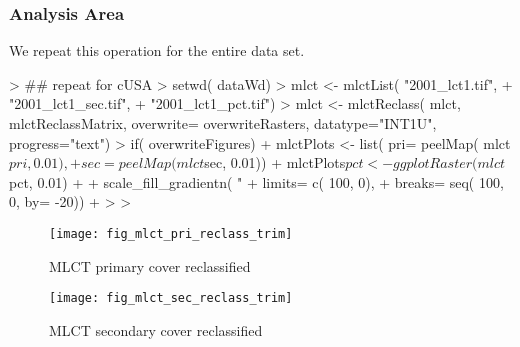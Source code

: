 \subsubsection{Analysis Area}
\label{sec:reclass-analysis-area}

We repeat this operation for the entire data set.


\begin{Schunk}
\begin{Sinput}
> ## repeat for cUSA
> setwd( dataWd)
> mlct <- mlctList( "2001_lct1.tif", 
+                   "2001_lct1_sec.tif", 
+                   "2001_lct1_pct.tif")
> mlct  <- mlctReclass( mlct, mlctReclassMatrix, overwrite= overwriteRasters, datatype="INT1U", progress="text")
> if( overwriteFigures) {
+   mlctPlots <- list( pri= peelMap( mlct$pri, 0.01),
+                     sec= peelMap( mlct$sec, 0.01))
+   mlctPlots$pct <- ggplotRaster( mlct$pct, 0.01) + 
+     scale_fill_gradientn( "% confidence", colours=rev( brewer.pal( 7, "YlGn")), 
+                          limits= c( 100, 0),
+                          breaks= seq( 100, 0, by= -20))
+ }
> 
> 
\end{Sinput}
\end{Schunk}

\begin{figure} 
\begin{center}

\begin{Schunk}
\end{Schunk}

\texttt{[image: fig\_mlct\_pri\_reclass\_trim]}
\end{center} 
\caption{MLCT primary cover reclassified} 
\label{fig:mlct_pri_reclass} 
\end{figure} 


\begin{figure} 
\begin{center}
  
\begin{Schunk}
\end{Schunk}

\texttt{[image: fig\_mlct\_sec\_reclass\_trim]}
\end{center} 
\caption{MLCT secondary cover reclassified} 
\label{fig:mlct_sec_reclass} 
\end{figure} 


